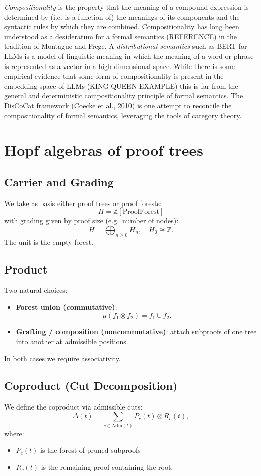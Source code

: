 \documentclass[a4paper,11pt]{report}
\begin{document}
 \emph{Compositionality} is the property that the meaning of a compound expression is determined by (i.e. is a function of) the meanings of its components and the syntactic rules by which they are combined. Compositionality has long been understood as a desideratum for a formal semantics (REFERENCE) in the tradition of Montague and Frege. A \emph{distributional semantics} such as BERT for LLMs is a model of linguistic meaning in which the meaning of a word or phrase is represented as a vector in a high-dimensional space. While there is some empirical evidence that some form of compositionality is present in the embedding space of LLMs (KING QUEEN EXAMPLE) this is far from the general and deterministic compositionality principle of formal semantics. The DisCoCat framework (Coecke et al., 2010) is one attempt to reconcile the compositionality of formal semantics, leveraging the tools of category theory. 


\section{Hopf algebras of proof trees}
\subsection*{Carrier and Grading}
We take as basis either proof trees or proof forests:
\[
H = \mathbb{Z}[\mathrm{ProofForest}]
\]
with grading given by proof size (e.g.\ number of nodes):
\[
H = \bigoplus_{n \ge 0} H_n, \quad H_0 \cong \mathbb{Z}.
\]
The unit is the empty forest.

\subsection*{Product}
Two natural choices:
\begin{itemize}
\item \textbf{Forest union (commutative)}:
\[
\mu(f_1 \otimes f_2) = f_1 \cup f_2.
\]
\item \textbf{Grafting / composition (noncommutative)}:
attach subproofs of one tree into another at admissible positions.
\end{itemize}
In both cases we require associativity.

\subsection*{Coproduct (Cut Decomposition)}
We define the coproduct via admissible cuts:
\[
\Delta(t) = \sum_{c \in \mathrm{Adm}(t)} P_c(t) \otimes R_c(t),
\]
where:
\begin{itemize}
\item $P_c(t)$ is the forest of pruned subproofs
\item $R_c(t)$ is the remaining proof containing the root.
\end{itemize}
\end{document}
